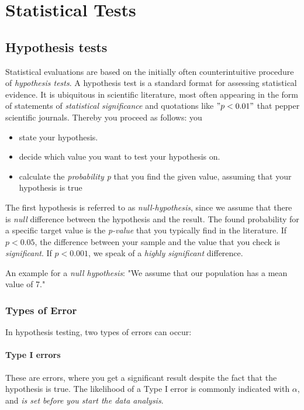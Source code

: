 \chapter{ Statistical Tests }

\section{Hypothesis tests}\label{sec:hypotheses} 
Statistical evaluations are based on the initially often counterintuitive procedure of \emph{hypothesis tests}. A hypothesis test is a standard format for assessing statistical evidence. It is ubiquitous in scientific literature, most often appearing in the form of statements of \emph{statistical significance} and quotations like $"p<0.01"$ that pepper scientific journals. Thereby you proceed as follows: you

\begin{itemize}
  \item   state your hypothesis.
  \item   decide which value you want to test your hypothesis on.
  \item   calculate the \emph{probability p} that you find the given value, assuming that your hypothesis is true
\end{itemize}

The first hypothesis is referred to as \emph{null-hypothesis}, since we assume that there is \emph{null} difference between the hypothesis and the result. The found probability for a specific target value is the \emph{p-value} that you typically find in the literature. If $p<0.05$, the difference between your sample and the value that you check is \emph{significant}. If $p<0.001$, we speak of a \emph{highly significant} difference.

An example for a \emph{null hypothesis}: "We assume that our population has a mean value of 7."

\subsection{ Types of Error}
In hypothesis testing, two types of errors can occur:

\subsubsection{Type I errors}  
These are errors, where you get a significant result despite the fact that the hypothesis is true. The likelihood of a Type I error is commonly indicated with $\alpha$, and \emph{is set before you start the data analysis}.

